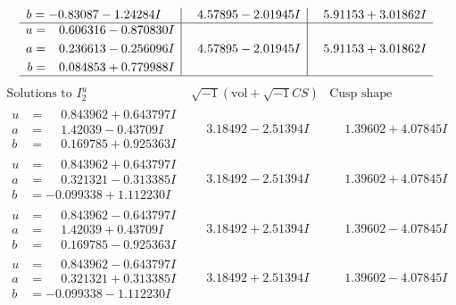 \documentclass[1p]{elsarticle_modified}
\theoremstyle{definition}
\newcommand{\I}{\sqrt{-1}}
\begin{document}
$$\begin{array}{c|c|c}
\begin{aligned}
b &= -0.83087 - 1.24284 I\end{aligned}
 & \phantom{-}4.57895 - 2.01945 I & \phantom{-}5.91153 + 3.01862 I \\ \hline\begin{aligned}
u &= \phantom{-}0.606316 - 0.870830 I \\
a &= \phantom{-}0.236613 - 0.256096 I \\
b &= \phantom{-}0.084853 + 0.779988 I\end{aligned}
 & \phantom{-}4.57895 - 2.01945 I & \phantom{-}5.91153 + 3.01862 I\\
 \hline 
 \end{array}$$\newpage$$\begin{array}{c|c|c}  
\text{Solutions to }I^u_{2}& \I (\text{vol} + \sqrt{-1}CS) & \text{Cusp shape}\\
 \hline 
\begin{aligned}
u &= \phantom{-}0.843962 + 0.643797 I \\
a &= \phantom{-}1.42039 - 0.43709 I \\
b &= \phantom{-}0.169785 + 0.925363 I\end{aligned}
 & \phantom{-}3.18492 - 2.51394 I & \phantom{-}1.39602 + 4.07845 I \\ \hline\begin{aligned}
u &= \phantom{-}0.843962 + 0.643797 I \\
a &= \phantom{-}0.321321 - 0.313385 I \\
b &= -0.099338 + 1.112230 I\end{aligned}
 & \phantom{-}3.18492 - 2.51394 I & \phantom{-}1.39602 + 4.07845 I \\ \hline\begin{aligned}
u &= \phantom{-}0.843962 - 0.643797 I \\
a &= \phantom{-}1.42039 + 0.43709 I \\
b &= \phantom{-}0.169785 - 0.925363 I\end{aligned}
 & \phantom{-}3.18492 + 2.51394 I & \phantom{-}1.39602 - 4.07845 I \\ \hline\begin{aligned}
u &= \phantom{-}0.843962 - 0.643797 I \\
a &= \phantom{-}0.321321 + 0.313385 I \\
b &= -0.099338 - 1.112230 I\end{aligned}
 & \phantom{-}3.18492 + 2.51394 I & \phantom{-}1.39602 - 4.07845 I \\ \hline\begin{aligned}

\end{aligned}
\end{array}$$
\end{document}
